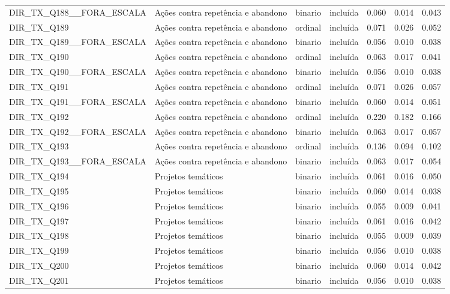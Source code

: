 \begin{tabular}{llllrrr}
DIR\_TX\_Q188\_\_FORA\_ESCALA & Ações contra repetência e abandono & binario & incluída & 0.060 & 0.014 & 0.043 \\
DIR\_TX\_Q189 & Ações contra repetência e abandono & ordinal & incluída & 0.071 & 0.026 & 0.052 \\
DIR\_TX\_Q189\_\_FORA\_ESCALA & Ações contra repetência e abandono & binario & incluída & 0.056 & 0.010 & 0.038 \\
DIR\_TX\_Q190 & Ações contra repetência e abandono & ordinal & incluída & 0.063 & 0.017 & 0.041 \\
DIR\_TX\_Q190\_\_FORA\_ESCALA & Ações contra repetência e abandono & binario & incluída & 0.056 & 0.010 & 0.038 \\
DIR\_TX\_Q191 & Ações contra repetência e abandono & ordinal & incluída & 0.071 & 0.026 & 0.057 \\
DIR\_TX\_Q191\_\_FORA\_ESCALA & Ações contra repetência e abandono & binario & incluída & 0.060 & 0.014 & 0.051 \\
DIR\_TX\_Q192 & Ações contra repetência e abandono & ordinal & incluída & 0.220 & 0.182 & 0.166 \\
DIR\_TX\_Q192\_\_FORA\_ESCALA & Ações contra repetência e abandono & binario & incluída & 0.063 & 0.017 & 0.057 \\
DIR\_TX\_Q193 & Ações contra repetência e abandono & ordinal & incluída & 0.136 & 0.094 & 0.102 \\
DIR\_TX\_Q193\_\_FORA\_ESCALA & Ações contra repetência e abandono & binario & incluída & 0.063 & 0.017 & 0.054 \\
DIR\_TX\_Q194 & Projetos temáticos & binario & incluída & 0.061 & 0.016 & 0.050 \\
DIR\_TX\_Q195 & Projetos temáticos & binario & incluída & 0.060 & 0.014 & 0.038 \\
DIR\_TX\_Q196 & Projetos temáticos & binario & incluída & 0.055 & 0.009 & 0.041 \\
DIR\_TX\_Q197 & Projetos temáticos & binario & incluída & 0.061 & 0.016 & 0.042 \\
DIR\_TX\_Q198 & Projetos temáticos & binario & incluída & 0.055 & 0.009 & 0.039 \\
DIR\_TX\_Q199 & Projetos temáticos & binario & incluída & 0.056 & 0.010 & 0.038 \\
DIR\_TX\_Q200 & Projetos temáticos & binario & incluída & 0.060 & 0.014 & 0.042 \\
DIR\_TX\_Q201 & Projetos temáticos & binario & incluída & 0.056 & 0.010 & 0.038 \\

\end{tabular}

